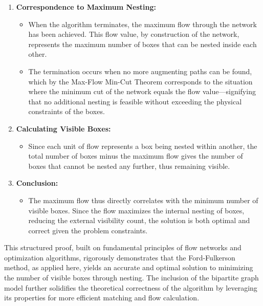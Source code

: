 \documentclass{article}
\begin{document}
\begin{enumerate}
            \item \textbf{Correspondence to Maximum Nesting:}
            \begin{itemize}
                \item When the algorithm terminates, the maximum flow through the network has been achieved. This flow value, by construction of the network, represents the maximum number of boxes that can be nested inside each other.
                \item The termination occurs when no more augmenting paths can be found, which by the Max-Flow Min-Cut Theorem corresponds to the situation where the minimum cut of the network equals the flow value—signifying that no additional nesting is feasible without exceeding the physical constraints of the boxes.
            \end{itemize}
        
            \item \textbf{Calculating Visible Boxes:}
            \begin{itemize}
                \item Since each unit of flow represents a box being nested within another, the total number of boxes minus the maximum flow gives the number of boxes that cannot be nested any further, thus remaining visible.
            \end{itemize}
        
            \item \textbf{Conclusion:}
            \begin{itemize}
                \item The maximum flow thus directly correlates with the minimum number of visible boxes. Since the flow maximizes the internal nesting of boxes, reducing the external visibility count, the solution is both optimal and correct given the problem constraints.
            \end{itemize}
        \end{enumerate}
    
    This structured proof, built on fundamental principles of flow networks and optimization algorithms, rigorously demonstrates that the Ford-Fulkerson method, as applied here, yields an accurate and optimal solution to minimizing the number of visible boxes through nesting. The inclusion of the bipartite graph model further solidifies the theoretical correctness of the algorithm by leveraging its properties for more efficient matching and flow calculation.
\end{document}
